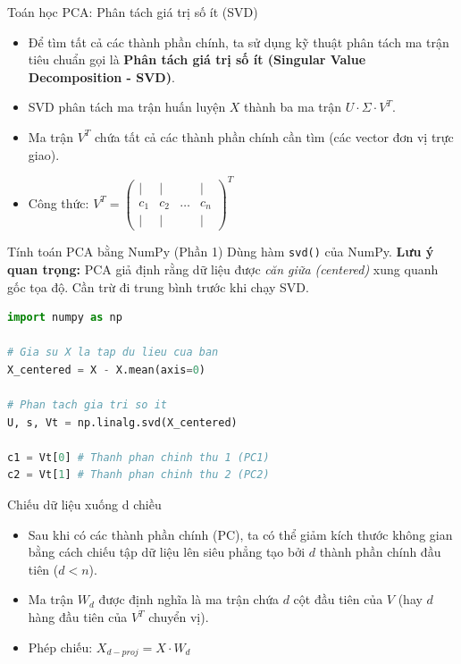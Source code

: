 \documentclass[aspectratio=169]{beamer}
\begin{document}
\begin{frame}{Toán học PCA: Phân tách giá trị số ít (SVD)}
    \begin{itemize}
        \item Để tìm tất cả các thành phần chính, ta sử dụng kỹ thuật phân tách ma trận tiêu chuẩn gọi là \textbf{Phân tách giá trị số ít (Singular Value Decomposition - SVD)}.
        \item SVD phân tách ma trận huấn luyện $X$ thành ba ma trận $U \cdot \Sigma \cdot V^T$.
        \item Ma trận $V^T$ chứa tất cả các thành phần chính cần tìm (các vector đơn vị trực giao).
        \item Công thức: $V^T = \begin{pmatrix} | & | & & | \\ c_1 & c_2 & \dots & c_n \\ | & | & & | \end{pmatrix}^T$
    \end{itemize}
\end{frame}

\begin{frame}[fragile]{Tính toán PCA bằng NumPy (Phần 1)}
    Dùng hàm \texttt{svd()} của NumPy.
    \textbf{Lưu ý quan trọng:} PCA giả định rằng dữ liệu được \textit{căn giữa (centered)} xung quanh gốc tọa độ. Cần trừ đi trung bình trước khi chạy SVD.
    \begin{lstlisting}[language=Python]
import numpy as np

# Gia su X la tap du lieu cua ban
X_centered = X - X.mean(axis=0)

# Phan tach gia tri so it
U, s, Vt = np.linalg.svd(X_centered)

c1 = Vt[0] # Thanh phan chinh thu 1 (PC1)
c2 = Vt[1] # Thanh phan chinh thu 2 (PC2)
    \end{lstlisting}
\end{frame}

\begin{frame}{Chiếu dữ liệu xuống d chiều}
    \begin{itemize}
        \item Sau khi có các thành phần chính (PC), ta có thể giảm kích thước không gian bằng cách chiếu tập dữ liệu lên siêu phẳng tạo bởi $d$ thành phần chính đầu tiên ($d < n$).
        \item Ma trận $W_d$ được định nghĩa là ma trận chứa $d$ cột đầu tiên của $V$ (hay $d$ hàng đầu tiên của $V^T$ chuyển vị).
        \item Phép chiếu: $X_{d-proj} = X \cdot W_d$
    \end{itemize}
\end{frame}
\end{document}
